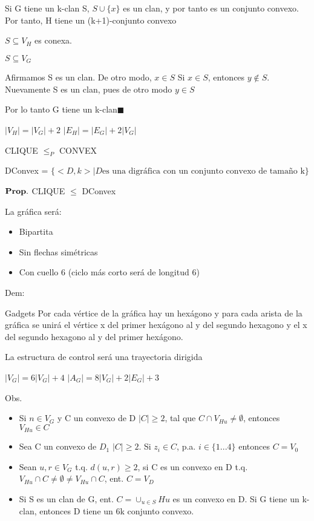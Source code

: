 \documentclass{homework}
\begin{document}
Si G tiene un k-clan S, $S \cup \{x\}$ es un clan, y por tanto es un conjunto convexo. Por tanto, H tiene un (k+1)-conjunto convexo

$S \subseteq V_H$ es conexa.

$S \subseteq V_G$

Afirmamos S es un clan. De otro modo, $x \in S$
Si $x \in S$, entonces $y \notin S$. Nuevamente S es un clan, pues de otro modo $y \in S$

Por lo tanto G tiene un k-clan$\blacksquare$

$|V_H| = |V_G| + 2$
$|E_H| = |E_G| + 2|V_G|$

CLIQUE $\leq_P$ CONVEX

DConvex = $\{<D,k>| D \text{es una digráfica con un conjunto convexo de tamaño k}\}$

$\bf{Prop.}$ CLIQUE $\leq$ DConvex

La gráfica será:
\begin{itemize}
	\item Bipartita
	\item Sin flechas simétricas
	\item Con cuello 6 (ciclo más corto será de longitud 6)
\end{itemize}

Dem: 

Gadgets 
Por cada vértice de la gráfica hay un hexágono y para cada arista de la gráfica se unirá el vértice x del primer hexágono al y del segundo hexagono y el x del segundo hexagono al y del primer hexágono.

La estructura de control será una trayectoria dirigida

$|V_G| = 6|V_G| + 4$
$|A_G| = 8|V_G| + 2|E_G| +3$

Obs.
\begin{itemize}
	\item Si $n \in V_G$ y C un convexo de D $|C| \geq 2$, tal que $C \cap V_{Hu} \neq \emptyset$, entonces $V_{Hu} \in C$
	\item Sea C un convexo de $D_1$ $|C| \geq 2$. Si $z_i \in C$, p.a. $i \in \{1...4\}$ entonces $C = V_0$
	\item Sean $u,r\in V_G$ t.q. $d(u,r) \geq 2$, si C es un convexo en D t.q. $V_{Hu} \cap C \neq \emptyset \neq V_{Hu} \cap C$, ent. $C = V_D$
	\item Si S es un clan de G, ent. $C = \cup_{u\in S} Hu$ es un convexo en D. Si G tiene un k-clan, entonces D tiene un 6k conjunto convexo.
\end{itemize}
\end{document}
